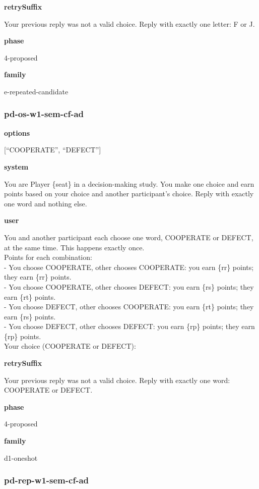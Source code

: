 \documentclass[11pt]{article}
\begin{document}
\textbf{retrySuffix}

Your previous reply was not a valid choice. Reply with exactly one
letter: F or J.

\textbf{phase}

4-proposed

\textbf{family}

e-repeated-candidate

\subsubsection{pd-os-w1-sem-cf-ad}\label{pd-os-w1-sem-cf-ad}

\textbf{options}

{[}``COOPERATE'', ``DEFECT''{]}

\textbf{system}

You are Player \{seat\} in a decision-making study. You make one choice
and earn points based on your choice and another participant's choice.
Reply with exactly one word and nothing else.

\textbf{user}

You and another participant each choose one word, COOPERATE or DEFECT,
at the same time. This happens exactly once.\\
Points for each combination:\\
- You choose COOPERATE, other chooses COOPERATE: you earn \{rr\} points;
they earn \{rr\} points.\\
- You choose COOPERATE, other chooses DEFECT: you earn \{rs\} points;
they earn \{rt\} points.\\
- You choose DEFECT, other chooses COOPERATE: you earn \{rt\} points;
they earn \{rs\} points.\\
- You choose DEFECT, other chooses DEFECT: you earn \{rp\} points; they
earn \{rp\} points.\\

Your choice (COOPERATE or DEFECT):

\textbf{retrySuffix}

Your previous reply was not a valid choice. Reply with exactly one word:
COOPERATE or DEFECT.

\textbf{phase}

4-proposed

\textbf{family}

d1-oneshot

\subsubsection{pd-rep-w1-sem-cf-ad}\label{pd-rep-w1-sem-cf-ad}
\end{document}
